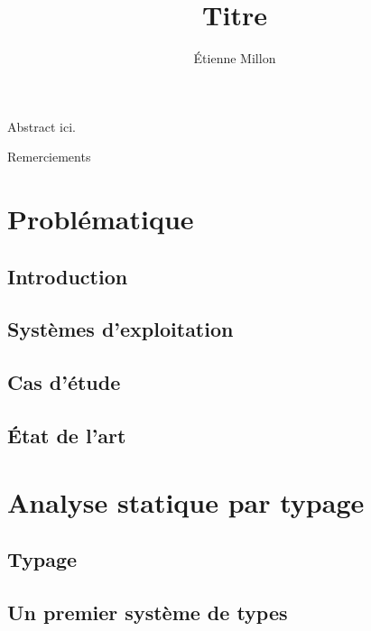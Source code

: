 \documentclass[a4paper,11pt]{memoir}
\title{Titre}
\author{Étienne Millon}
\begin{document}
\frontmatter

\maketitle

\cleartorecto

\asuabstract

Abstract ici.

\asuacknowledgements

Remerciements


\tableofcontents

\mainmatter

\part{Problématique}

\chapter{Introduction}

\chapter{Systèmes d'exploitation}

\label{cha:os}


\chapter{Cas d'étude}



\chapter{État de l'art}



\part{Analyse statique par typage}

\chapter{Typage}



\chapter{Un premier système de types}
\end{document}
